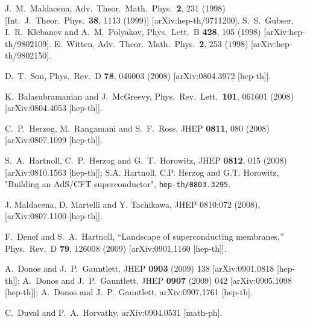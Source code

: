 \documentclass[12pt]{article}
\newcommand{\hepth}[1]{{\tt hep-th/{#1}}}
\begin{document}
\begin{thebibliography}{99}
  J.~M.~Maldacena,
  Adv.\ Theor.\ Math.\ Phys.\  {\bf 2}, 231 (1998)
  [Int.\ J.\ Theor.\ Phys.\  {\bf 38}, 1113 (1999)]
  [arXiv:hep-th/9711200].
  S.~S.~Gubser, I.~R.~Klebanov and A.~M.~Polyakov,
  Phys.\ Lett.\  B {\bf 428}, 105 (1998)
  [arXiv:hep-th/9802109].
  E.~Witten,
  Adv.\ Theor.\ Math.\ Phys.\  {\bf 2}, 253 (1998)
  [arXiv:hep-th/9802150].


  D.~T.~Son,
  Phys.\ Rev.\  D {\bf 78}, 046003 (2008)
  [arXiv:0804.3972 [hep-th]].

  K.~Balasubramanian and J.~McGreevy,
  Phys.\ Rev.\ Lett.\  {\bf 101}, 061601 (2008)
  [arXiv:0804.4053 [hep-th]].


  C.~P.~Herzog, M.~Rangamani and S.~F.~Ross,
  JHEP {\bf 0811}, 080 (2008)
  [arXiv:0807.1099 [hep-th]].

  S.~A.~Hartnoll, C.~P.~Herzog and G.~T.~Horowitz,
  JHEP {\bf 0812}, 015 (2008)
  [arXiv:0810.1563 [hep-th]];
 S.A. Hartnoll, C.P. Herzog and G.T. Horowitz, "Building an 
AdS/CFT superconductor", \hepth{0803.3295}. 

 J. Maldacena, D. Martelli and Y. Tachikawa, 
JHEP 0810:072 (2008), [arXiv:0807.1100 [hep-th]]. 

  F.~Denef and S.~A.~Hartnoll,
  ``Landscape of superconducting membranes,''
  Phys.\ Rev.\  D {\bf 79}, 126008 (2009)
  [arXiv:0901.1160 [hep-th]].

A.~Donos and J.~P.~Gauntlett,
JHEP {\bf 0903} (2009) 138
[arXiv:0901.0818 [hep-th]];
A.~Donos and J.~P.~Gauntlett,
JHEP {\bf 0907} (2009) 042
[arXiv:0905.1098 [hep-th]];
A.~Donos and J.~P.~Gauntlett,
arXiv:0907.1761 [hep-th].

C.~Duval and P.~A.~Horvathy,
arXiv:0904.0531 [math-ph].


\end{thebibliography}
\end{document}
